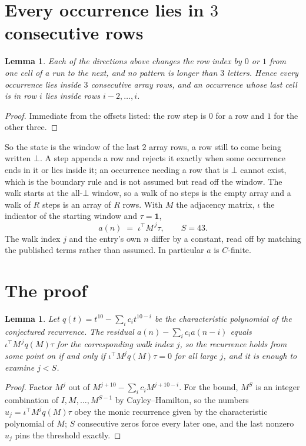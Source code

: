 \documentclass[11pt,a4paper]{article}
\theoremstyle{plain}
\newtheorem{lemma}[theorem]{Lemma}
\theoremstyle{definition}
\begin{document}
\section{Every occurrence lies in $3$ consecutive rows}

\begin{lemma}\label{lem:win}
Each of the directions above changes the row index by $0$ or $1$ from one cell of a run to the
next, and no pattern is longer than $3$ letters. Hence every occurrence lies inside $3$
consecutive array rows, and an occurrence whose last cell is in row $i$ lies inside rows
$i-2,\dots,i$.
\end{lemma}

\begin{proof}
Immediate from the offsets listed: the row step is $0$ for a row and $1$ for the other three.
\end{proof}

So the state is the window of the last $2$ array rows, a row still to come being written
$\bot$. A step appends a row and rejects it exactly when some occurrence ends in it or lies
inside it; an occurrence needing a row that is $\bot$ cannot exist, which is the boundary rule
and is not assumed but read off the window. The walk starts at the all-$\bot$ window, so a walk
of no steps is the empty array and a walk of $R$ steps is an array of $R$ rows. With $M$ the
adjacency matrix, $\iota$ the indicator of the starting window and $\tau=\mathbf{1}$,
\[
a(n)\;=\;\iota^{\!\top}M^{\,j}\tau ,\qquad S=43.
\]
The walk index $j$ and the entry's own $n$ differ by a constant, read off by matching the
published terms rather than assumed. In particular $a$ is $C$-finite.

\section{The proof}

\begin{lemma}\label{lem:crit}
Let $q(t)=t^{10}-\sum_i c_it^{10-i}$ be the characteristic polynomial of the
conjectured recurrence. The residual $a(n)-\sum_ic_ia(n-i)$ equals
$\iota^{\!\top}M^{\,j}q(M)\tau$ for the corresponding walk index $j$, so the recurrence
holds from some point on if and only if $\iota^{\!\top}M^{j}q(M)\tau=0$ for all large $j$,
and it is enough to examine $j<S$.
\end{lemma}

\begin{proof}
Factor $M^{j}$ out of $M^{j+10}-\sum_ic_iM^{j+10-i}$. For the bound, $M^{S}$
is an integer combination of $I,M,\dots,M^{S-1}$ by Cayley--Hamilton, so the numbers
$u_j=\iota^{\!\top}M^{j}q(M)\tau$ obey the monic recurrence given by the characteristic
polynomial of $M$; $S$ consecutive zeros force every later one, and the last nonzero $u_j$
pins the threshold exactly.
\end{proof}
\end{document}
